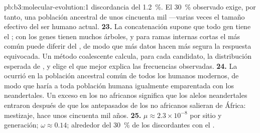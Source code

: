 \begin{solution}{pb:b3:molecular-evolution:1}
discordancia del \qty{1.2}{\%}. El \qty{30}{\%} observado exige, por
tanto, una población ancestral de unos cincuenta mil ---varias veces el
tamaño efectivo del ser humano actual.
\textbf{23.} La concatenación supone que todo gen tiene el ; con  los genes tienen
muchos árboles, y para ramas internas cortas el  más
común puede diferir del , de modo que más datos hacen
más segura la respuesta equivocada. Un método coalescente calcula, para
cada  candidato, la distribución esperada de , y elige el  que mejor explica las frecuencias
observadas.
\textbf{24.} La  ocurrió en la
población ancestral común de todos los humanos modernos, de modo que
haría a toda población humana igualmente emparentada con los
neandertales. Un exceso en los no africanos significa que los alelos
neandertales entraron después de que los antepasados de los no
africanos salieran de África: mestizaje, hace unos cincuenta mil años.
\textbf{25.} $\mu \approx 2.3\times 10^{-8}$ por sitio y generación;
$\omega \approx 0.14$; alrededor del \qty{30}{\%} de los  discordantes con el .
\end{solution}
